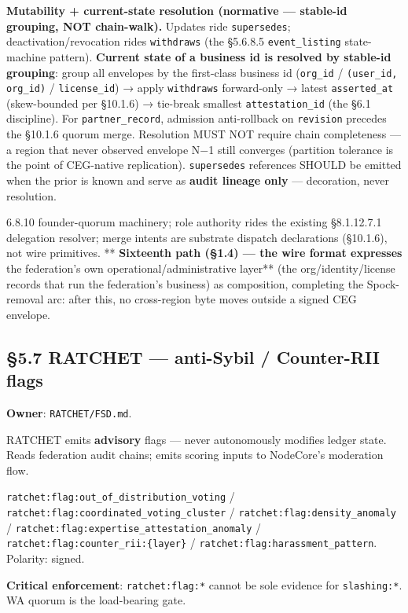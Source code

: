 \documentclass[11pt]{article}
\begin{document}
\textbf{Mutability + current-state resolution (normative — stable-id grouping, NOT chain-walk).} Updates ride \texttt{supersedes}; deactivation/revocation rides \texttt{withdraws} (the §5.6.8.5 \texttt{event\_listing} state-machine pattern). \textbf{Current state of a business id is resolved by stable-id grouping}: group all envelopes by the first-class business id (\texttt{org\_id} / \texttt{(user\_id, org\_id)} / \texttt{license\_id}) → apply \texttt{withdraws} forward-only → latest \texttt{asserted\_at} (skew-bounded per §10.1.6) → tie-break smallest \texttt{attestation\_id} (the §6.1 discipline). For \texttt{partner\_record}, admission anti-rollback on \texttt{revision} precedes the §10.1.6 quorum merge. Resolution MUST NOT require chain completeness — a region that never observed envelope N−1 still converges (partition tolerance is the point of CEG-native replication). \texttt{supersedes} references SHOULD be emitted when the prior is known and serve as \textbf{audit lineage only} — decoration, never resolution.


6.8.10 founder-quorum machinery; role authority rides the existing §8.1.12.7.1 delegation resolver; merge intents are substrate dispatch declarations (§10.1.6), not wire primitives. **\textbf{ Sixteenth path (§1.4) — the wire format expresses }the federation's own operational/administrative layer** (the org/identity/license records that run the federation's business) as composition, completing the Spock-removal arc: after this, no cross-region byte moves outside a signed CEG envelope.


\subsection*{§5.7 RATCHET — anti-Sybil / Counter-RII flags}


\textbf{Owner}: \texttt{RATCHET/FSD.md}.


RATCHET emits \textbf{advisory} flags — never autonomously modifies ledger state. Reads federation audit chains; emits scoring inputs to NodeCore's moderation flow.


\texttt{ratchet:flag:out\_of\_distribution\_voting} / \texttt{ratchet:flag:coordinated\_voting\_cluster} / \texttt{ratchet:flag:density\_anomaly} / \texttt{ratchet:flag:expertise\_attestation\_anomaly} / \texttt{ratchet:flag:counter\_rii:\{layer\}} / \texttt{ratchet:flag:harassment\_pattern}. Polarity: signed.


\textbf{Critical enforcement}: \texttt{ratchet:flag:*} cannot be sole evidence for \texttt{slashing:*}. WA quorum is the load-bearing gate.
\end{document}
